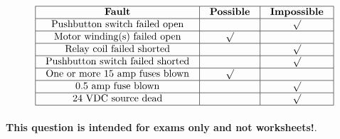 \vfil 

\eject







$$\vbox{\offinterlineskip
\halign{\strut
\vrule \quad\hfil # \ \hfil & 
\vrule \quad\hfil # \ \hfil & 
\vrule \quad\hfil # \ \hfil \vrule \cr
\noalign{\hrule}
%
{\bf Fault} & {\bf Possible} & {\bf Impossible} \cr
%
\noalign{\hrule}
%
Pushbutton switch failed open &  & $\surd$ \cr
%
\noalign{\hrule}
%
Motor winding(s) failed open & $\surd$ &  \cr
%
\noalign{\hrule}
%
Relay coil failed shorted &  & $\surd$ \cr
%
\noalign{\hrule}
%
Pushbutton switch failed shorted &  & $\surd$ \cr
%
\noalign{\hrule}
%
One or more 15 amp fuses blown & $\surd$ &  \cr
%
\noalign{\hrule}
%
0.5 amp fuse blown &  & $\surd$ \cr
%
\noalign{\hrule}
%
24 VDC source dead &  & $\surd$ \cr
%
\noalign{\hrule}
} %
}$$ %







{\bf This question is intended for exams only and not worksheets!}.


